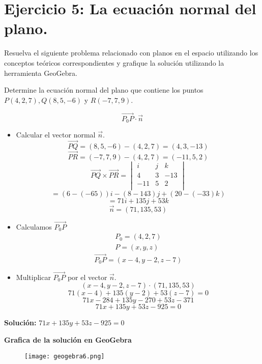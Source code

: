 \section{\large Ejercicio 5: La ecuación normal del plano.}

Resuelva el siguiente problema relacionado con planos en el espacio utilizando los conceptos teóricos correspondientes y grafique la solución utilizando la herramienta GeoGebra.

Determine la ecuación normal del plano que contiene los puntos $P(4,2,7),Q(8,5,-6)$ y $R(-7,7,9)$.

\[\vec{P_0P}\cdot\vec{n}\]
\begin{itemize}
    \item Calcular el vector normal $\vec{n}$.
    \[\vec{PQ}=(8,5,-6)-(4,2,7)=(4,3,-13)\]
    \[\vec{PR}=(-7,7,9)-(4,2,7)=(-11,5,2)\]
    \[
        \vec{PQ}\times\vec{PR} = 
        \begin{vmatrix}
            i & j & k \\
            4 & 3 & -13 \\
            -11 & 5 & 2 \\
        \end{vmatrix}
    \]
    \[=(6-(-65))i-(8-143)j+(20-(-33)k)\]
    \[=71i+135j+53k\]
    \[\vec{n}=(71,135,53)\]
    \item Calculamos \(\vec{P_0P}\)
    \[
        \begin{aligned}
            P_0=(4,2,7) \\
            P=(x,y,z)  
        \end{aligned}
    \]
    \[
        \vec{P_0P}=(x-4,y-2,z-7)
    \]
    \item Multiplicar $\vec{P_0P}$ por el vector $\vec{n}$.
    \[(x-4,y-2,z-7)\cdot(71,135,53)\]
    \[71(x-4)+135(y-2)+53(z-7)=0\]
    \[71x-284+135y-270+53z-371\]
    \[71x+135y+53z-925=0\]
\end{itemize}
\begin{center}
    \textbf{Solución:} $71x+135y+53z-925=0$
\end{center}

\newpage
\textbf{Grafica de la solución en GeoGebra}
\begin{figure}[ht!]
    \texttt{[image: geogebra6.png]}
\end{figure}
